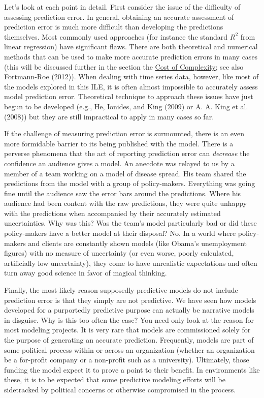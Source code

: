 \documentclass[]{memoir}
\begin{document}
Let's look at each point in detail. First consider the issue of the
difficulty of assessing prediction error. In general, obtaining an
accurate assessment of prediction error is much more difficult than
developing the predictions themselves. Most commonly used approaches
(for instance the standard $R^2$ from linear regression) have
significant flaws. There are both theoretical and numerical methods that
can be used to make more accurate prediction errors in many cases (this
will be discussed further in the section the
\hyperref[ComplexityCost]{Cost of Complexity}; see also Fortmann-Roe
(2012)). When dealing with time series data, however, like most of the
models explored in this ILE, it is often almost impossible to accurately
assess model prediction error. Theoretical technique to approach these
issues have just begun to be developed (e.g., He, Ionides, and King
(2009) or A. A. King et al. (2008)) but they are still impractical to
apply in many cases so far.

If the challenge of measuring prediction error is surmounted, there is
an even more formidable barrier to its being published with the model.
There is a perverse phenomena that the act of reporting prediction error
can \emph{decrease} the confidence an audience gives a model. An
anecdote was relayed to us by a member of a team working on a model of
disease spread. His team shared the predictions from the model with a
group of policy-makers. Everything was going fine until the audience saw
the error bars around the predictions. Where his audience had been
content with the raw predictions, they were quite unhappy with the
predictions when accompanied by their accurately estimated
uncertainties. Why was this? Was the team's model particularly bad or
did these policy-makers have a better model at their disposal? No. In a
world where policy-makers and clients are constantly shown models (like
Obama's unemployment figures) with no measure of uncertainty (or even
worse, poorly calculated, artificially low uncertainty), they come to
have unrealistic expectations and often turn away good science in favor
of magical thinking.

Finally, the most likely reason supposedly predictive models do not
include prediction error is that they simply are not predictive. We have
seen how models developed for a purportedly predictive purpose can
actually be narrative models in disguise. Why is this too often the
case? You need only look at the reason for most modeling projects. It is
very rare that models are commissioned solely for the purpose of
generating an accurate prediction. Frequently, models are part of some
political process within or across an organization (whether an
organization be a for-profit company or a non-profit such as a
university). Ultimately, those funding the model expect it to prove a
point to their benefit. In environments like these, it is to be expected
that some predictive modeling efforts will be sidetracked by political
concerns or otherwise compromised in the process.
\end{document}
